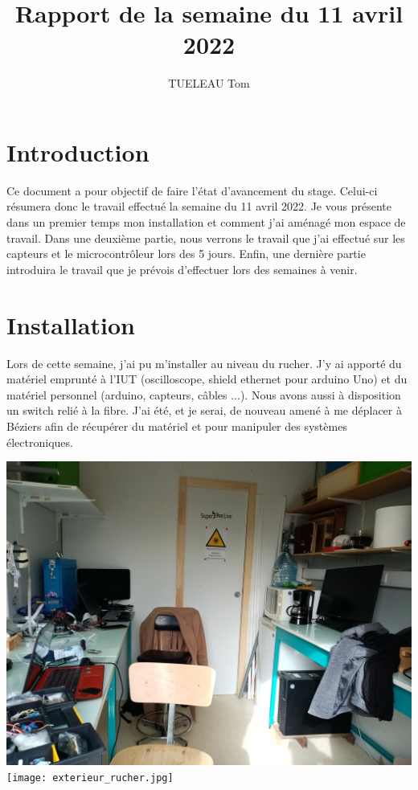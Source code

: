 \documentclass[12pt]{article}
\title{Rapport de la semaine du 11 avril 2022}
\author{TUELEAU Tom}
\begin{document}
\maketitle
\section{Introduction}
Ce document a pour objectif de faire l'état d'avancement du stage. Celui-ci résumera donc le travail effectué la semaine du 11 avril 2022.
Je vous présente dans un premier temps mon installation et comment j'ai aménagé mon espace de travail. Dans une deuxième partie,
nous verrons le travail que j'ai effectué sur les capteurs et le microcontrôleur lors des 5 jours. Enfin, une dernière partie introduira le travail 
que je prévois d'effectuer lors des semaines à venir. 

\section{Installation}
Lors de cette semaine, j'ai pu m'installer au niveau du rucher. J'y ai apporté du matériel emprunté à l'IUT (oscilloscope, shield ethernet pour
arduino Uno) et du matériel personnel (arduino, capteurs, câbles ...). Nous avons aussi à disposition un switch relié à la fibre. J'ai été, et je serai,
de nouveau amené à me déplacer à Béziers afin de récupérer du matériel et pour manipuler des systèmes électroniques.

\begin{center}	
\includegraphics[scale=0.075]{interieur_rucher.jpg}
\label{image1}
\texttt{[image: exterieur\_rucher.jpg]}
\label{image2}
\end{center}
\end{document}
